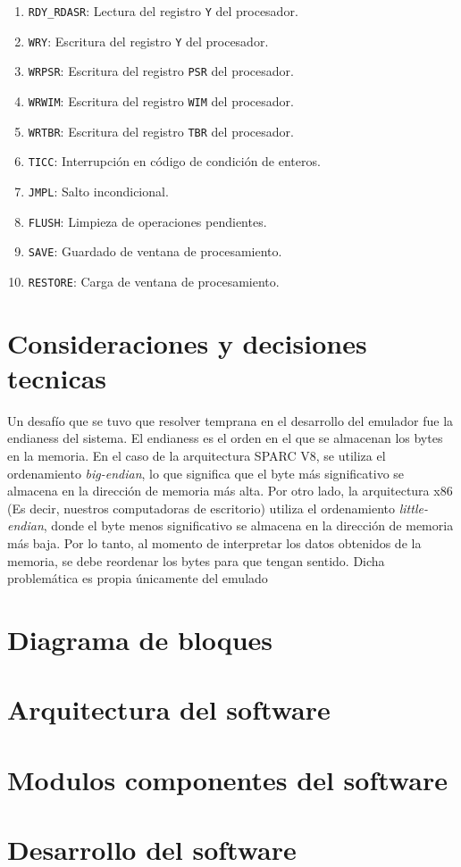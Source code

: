 \begin{enumerate}
\item \texttt{RDY\_RDASR}: Lectura del registro \texttt{Y} del procesador.

\item \texttt{WRY}: Escritura del registro \texttt{Y} del procesador.
\item \texttt{WRPSR}: Escritura del registro \texttt{PSR} del procesador.
\item \texttt{WRWIM}: Escritura del registro \texttt{WIM} del procesador.
\item \texttt{WRTBR}: Escritura del registro \texttt{TBR} del procesador.

\item \texttt{TICC}: Interrupción en código de condición de enteros.

\item \texttt{JMPL}: Salto incondicional.
\item \texttt{FLUSH}: Limpieza de operaciones pendientes.
\item \texttt{SAVE}: Guardado de ventana de procesamiento.
\item \texttt{RESTORE}: Carga de ventana de procesamiento.

\end{enumerate}


\section{Consideraciones y decisiones tecnicas}
\label{sec:consideraciones_decisiones_tecnicas}

Un desafío que se tuvo que resolver temprana en el desarrollo del emulador fue la endianess del sistema. El endianess es el orden en el que se almacenan los bytes en la memoria. En el caso de la arquitectura SPARC V8, se utiliza el ordenamiento \textit{big-endian}, lo que significa que el byte más significativo se almacena en la dirección de memoria más alta. Por otro lado, la arquitectura x86 (Es decir, nuestros computadoras de escritorio) utiliza el ordenamiento \textit{little-endian}, donde el byte menos significativo se almacena en la dirección de memoria más baja. Por lo tanto, al momento de interpretar los datos obtenidos de la memoria, se debe reordenar los bytes para que tengan sentido. Dicha problemática es propia únicamente del emulado

\section{Diagrama de bloques}
\label{sec:diag_bloques}

\section{Arquitectura del software}
\label{sec:arquitectura_software}

\section{Modulos componentes del software}
\label{sec:modulos_componentes_software}


\section{Desarrollo del software}
\label{sec:desarrollo_software}

